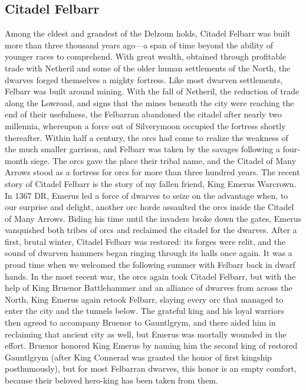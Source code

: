 \documentclass[10pt,a4paper,twoside,twocolumn,openany,bg=print,nodeprecatedcode]{dndbook}
\begin{document}
\subsection{Citadel Felbarr}
Among the eldest and grandest of the Delzoun holds, Citadel Felbarr was built more than three thousand years ago—a span of time beyond the ability of younger races to comprehend. With great wealth, obtained through profitable trade with Netheril and some of the older human settlements of the North, the dwarves forged themselves a mighty fortress.
Like most dwarven settlements, Felbarr was built around mining. With the fall of Netheril, the reduction of trade along the Lowroad, and signs that the mines beneath the city were reaching the end of their usefulness, the Felbarran abandoned the citadel after nearly two millennia, whereupon a force out of Silverymoon occupied the fortress shortly thereafter. Within half a century, the orcs had come to realize the weakness of the much smaller garrison, and Felbarr was taken by the savages following a four-month siege. The orcs gave the place their tribal name, and the Citadel of Many Arrows stood as a fortress for orcs for more than three hundred years.
The recent story of Citadel Felbarr is the story of my fallen friend, King Emerus Warcrown. In 1367 DR, Emerus led a force of dwarves to seize on the advantage when, to our surprise and delight, another orc horde assaulted the orcs inside the Citadel of Many Arrows. Biding his time until the invaders broke down the gates, Emerus vanquished both tribes of orcs and reclaimed the citadel for the dwarves. After a first, brutal winter, Citadel Felbarr was restored: its forges were relit, and the sound of dwarven hammers began ringing through its halls once again. It was a proud time when we welcomed the following summer with Felbarr back in dwarf hands.
In the most recent war, the orcs again took Citadel Felbarr, but with the help of King Bruenor Battlehammer and an alliance of dwarves from across the North, King Emerus again retook Felbarr, slaying every orc that managed to enter the city and the tunnels below. The grateful king and his loyal warriors then agreed to accompany Bruenor to Gauntlgrym, and there aided him in reclaiming that ancient city as well, but Emerus was mortally wounded in the effort. Bruenor honored King Emerus by naming him the second king of restored Gauntlgrym (after King Connerad was granted the honor of first kingship posthumously), but for most Felbarran dwarves, this honor is an empty comfort, because their beloved hero-king has been taken from them.
\end{document}
